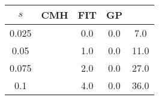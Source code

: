 \centering \begin{tabular}{c|c|c|c|c}
$s$	&CMH	&FIT	&GP	&\sc{Clear}\\\hline
0.025	&	&0.0	&0.0	&7.0\\
0.05	&	&1.0	&0.0	&11.0\\
0.075	&	&2.0	&0.0	&27.0\\
0.1	&	&4.0	&0.0	&36.0\\
\end{tabular}
